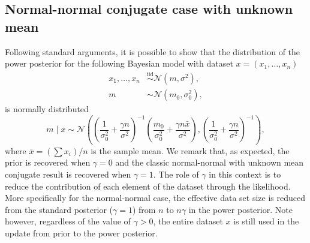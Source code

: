 \documentclass[12pt]{article}
\begin{document}
\subsection{Normal-normal conjugate case with unknown mean}
Following standard arguments, it is possible to show that the distribution of
the power posterior for the following Bayesian model with dataset $x = (x_1,
\ldots, x_n)$
\begin{subequations}
\begin{align}
x_1, \ldots, x_n &\overset{\mathrm{iid}}{\sim} \mathcal{N}(m, \sigma^2), \\
m &\sim \mathcal{N}(m_0, \sigma_0^2),
\end{align}
\end{subequations}
is normally distributed
\begin{equation*}
m \;|\; x \sim \mathcal{N} \left( \left( \frac{1}{\sigma_0^2} + \frac{\gamma n}{\sigma^2} \right)^{-1} \left(\frac{m_0}{\sigma_0^2} + \frac{\gamma n \bar{x}}{\sigma^2}  \right), \left( \frac{1}{\sigma_0^2} + \frac{\gamma n}{\sigma^2} \right)^{-1} \right),
\end{equation*}
where $\bar{x} = (\sum x_i)/ n$ is the sample mean. We remark that, as
expected, the prior is recovered when $\gamma = 0$ and the classic
normal-normal with unknown mean conjugate result is recovered when $\gamma =
1$. The role of $\gamma$ in this context is to reduce the contribution of each
element of the dataset through the likelihood. More specifically for the
normal-normal case, the effective data set size is reduced from the standard
posterior ($\gamma = 1$) from $n$ to $n \gamma$ in the power posterior. Note
however, regardless of the value of $\gamma > 0$, the entire dataset $x$ is
still used in the update from prior to the power posterior.
\end{document}
